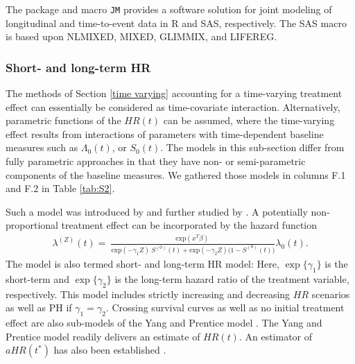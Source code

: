 \noindent 


\noindent The package and macro \texttt{JM} provides a software solution for joint modeling of longitudinal and time-to-event data in R and SAS, respectively. The SAS macro is based upon NLMIXED, MIXED, GLIMMIX, and LIFEREG.

\noindent 


\subsubsection{Short- and long-term HR}\label{shortHR}

\noindent 

\noindent The methods of Section \ref{time varying}  accounting for a time-varying treatment effect can essentially be considered as time-covariate interaction. Alternatively, parametric functions of the $HR(t)$ can be assumed, where the time-varying effect results from interactions of parameters with time-dependent baseline measures such as $\Lambda_0(t)$, or $S_0(t)$. 
The models in this sub-section differ from fully parametric approaches in that they have non- or semi-parametric components of the baseline measures.
We gathered those models in columns F.1 and F.2 in Table \ref{tab:S2}.

\noindent 


\noindent Such a model was introduced by \cite{Yang.2005} and further studied by \cite{Yang.2015}.
A potentially non-proportional treatment effect can be incorporated by the hazard function 
\begin{align*}
{\lambda }^{\left(Z\right)}\left(t\right)=\ \frac{{\mathrm{exp} \left(x^T\beta \right)\ }}{{\mathrm{exp} \left(-{\gamma }_1Z\right)\ }S^{\left(0\right)}\left(t\right)+{\mathrm{exp} \left(-{\gamma }_2Z\right){(1-S}^{\left(0\right)}\left(t\right)})}{\lambda }_0(t).
\end{align*}
The model is also termed short- and long-term HR model:
Here, $\exp\{\gamma_1\}$ is the short-term and $\exp\{\gamma_2\}$ is the long-term hazard ratio of the treatment variable, respectively.
This model includes strictly increasing and decreasing $HR$ scenarios as well as PH if $\gamma_1=\gamma_2$. Crossing survival curves as well as no initial treatment effect are also sub-models of the Yang and Prentice model \cite{Yang.2005}. The Yang and Prentice model readily delivers an estimate of $HR(t)$.
An estimator of $aHR(t^*)$ has also been established \cite{Yang.2019}. 

